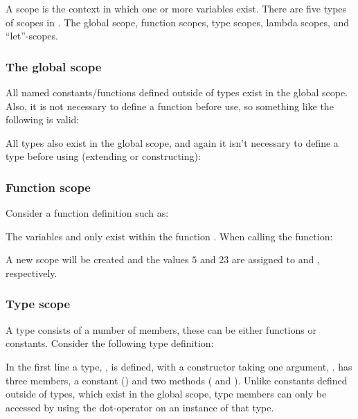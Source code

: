 A scope is the context in which one or more variables exist.
There are five types of scopes in \productname{}. The global scope,
function scopes, type scopes, lambda scopes, and ``let''-scopes.

\subsubsection{The global scope}

All named constants/functions defined outside of types exist in the global scope.
Also, it is not necessary to define a function before use, so something
like the following is valid:


All types also exist in the global scope, and again it isn't necessary to define
a type before using (extending or constructing):


\subsubsection{Function scope}
Consider a function definition such as:


The variables  and  only exist within the function .
When calling the function:


A new scope will be created and the values $5$ and $23$
are assigned to  and , respectively.


\subsubsection{Type scope}

A type consists of a number of members, these can be either functions or constants.
Consider the following type definition:


In the first line a type, , is defined, with a constructor taking one
argument, .  has three members, a constant ()
and two methods ( and ). Unlike constants defined
outside of types, which exist in the global scope, type members can only be accessed by
using the dot-operator on an instance of that type.

